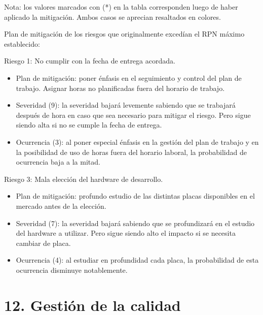 \documentclass[
11pt, %
]{charter}
\begin{document}
Nota: los valores marcados con (*) en la tabla corresponden luego de haber aplicado la mitigación. Ambos casos se aprecian resaltados en colores.

Plan de mitigación de los riesgos que originalmente excedían el RPN máximo establecido:
 
Riesgo 1: No cumplir con la fecha de entrega acordada.
\begin{itemize}
	\item Plan de mitigación: poner énfasis en el seguimiento y control del plan de trabajo. Asignar horas no planificadas fuera del horario de trabajo.
	\item Severidad (9): la severidad bajará levemente sabiendo que se trabajará después de hora en caso que sea necesario para mitigar el riesgo. Pero sigue siendo alta si no se cumple la fecha de entrega.
	\item Ocurrencia (3): al poner especial énfasis en la gestión del plan de trabajo y en la posibilidad de uso de horas fuera del horario laboral, la probabilidad de ocurrencia baja a la mitad.
\end{itemize}

Riesgo 3: Mala elección del hardware de desarrollo.
\begin{itemize}
	\item Plan de mitigación: profundo estudio de las distintas placas disponibles en el mercado antes de la elección.
	\item Severidad (7): la severidad bajará sabiendo que se profundizará en el estudio del hardware a utilizar. Pero sigue siendo alto el impacto si se necesita cambiar de placa.
	\item Ocurrencia (4): al estudiar en profundidad cada placa, la probabilidad de esta ocurrencia disminuye notablemente.
\end{itemize}

\section{12. Gestión de la calidad}
\label{sec:calidad}
\end{document}

